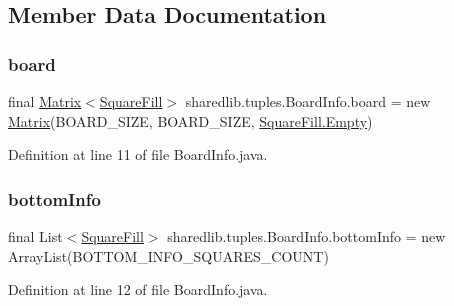 \subsection{Member Data Documentation}
\hypertarget{classsharedlib_1_1tuples_1_1_board_info_abd81f6dcb7dd4169511df3a3e61e300b}{}\label{classsharedlib_1_1tuples_1_1_board_info_abd81f6dcb7dd4169511df3a3e61e300b} 
\subsubsection{\texorpdfstring{board}{board}}
{\footnotesize\ttfamily final \hyperlink{classsharedlib_1_1utils_1_1_matrix}{Matrix}$<$\hyperlink{enumsharedlib_1_1tuples_1_1_board_info_1_1_square_fill}{Square\+Fill}$>$ sharedlib.\+tuples.\+Board\+Info.\+board = new \hyperlink{classsharedlib_1_1utils_1_1_matrix}{Matrix}(B\+O\+A\+R\+D\+\_\+\+S\+I\+ZE, B\+O\+A\+R\+D\+\_\+\+S\+I\+ZE, \hyperlink{enumsharedlib_1_1tuples_1_1_board_info_1_1_square_fill_a3b74fd396b72ace18187bde81bd4d658}{Square\+Fill.\+Empty})}



Definition at line 11 of file Board\+Info.\+java.

\hypertarget{classsharedlib_1_1tuples_1_1_board_info_a21cc80a378b7fb5fd212489ed34d06ab}{}\label{classsharedlib_1_1tuples_1_1_board_info_a21cc80a378b7fb5fd212489ed34d06ab} 
\subsubsection{\texorpdfstring{bottom\+Info}{bottomInfo}}
{\footnotesize\ttfamily final List$<$\hyperlink{enumsharedlib_1_1tuples_1_1_board_info_1_1_square_fill}{Square\+Fill}$>$ sharedlib.\+tuples.\+Board\+Info.\+bottom\+Info = new Array\+List(B\+O\+T\+T\+O\+M\+\_\+\+I\+N\+F\+O\+\_\+\+S\+Q\+U\+A\+R\+E\+S\+\_\+\+C\+O\+U\+NT)}



Definition at line 12 of file Board\+Info.\+java.

\hypertarget{classsharedlib_1_1tuples_1_1_board_info_ae0dd002903420dfad2aee8f77dc2be10}{}\label{classsharedlib_1_1tuples_1_1_board_info_ae0dd002903420dfad2aee8f77dc2be10} 
